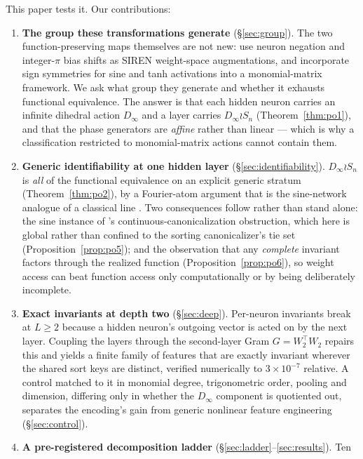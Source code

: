 \documentclass[10pt,twocolumn,letterpaper]{article}
\theoremstyle{definition}
\newcommand{\Dinf}{D_\infty}
\begin{document}
This paper tests it. Our contributions:

\begin{enumerate}\itemsep2pt
\item \textbf{The group these transformations generate} (\S\ref{sec:group}). The two
function-preserving maps themselves are not new: \citet{shamsian2024augmentations} use neuron
negation and integer-$\pi$ bias shifts as SIREN weight-space augmentations, and
\citet{tran2024monomial} incorporate sign symmetries for sine and tanh activations into a
monomial-matrix framework. We ask what group they generate and whether it exhausts functional
equivalence. The answer is that each hidden neuron carries an infinite dihedral action $\Dinf$ and
a layer carries $\Dinf \wr S_n$ (Theorem~\ref{thm:po1}), and that the phase generators are
\emph{affine} rather than linear --- which is why a classification restricted to monomial-matrix
actions cannot contain them.
\item \textbf{Generic identifiability at one hidden layer} (\S\ref{sec:identifiability}).
$\Dinf \wr S_n$ is \emph{all} of the functional equivalence on an explicit generic stratum
(Theorem~\ref{thm:po2}), by a Fourier-atom argument that is the sine-network analogue of a
classical line \citep{hechtnielsen1990algebraic,sussmann1992uniqueness,fefferman1994reconstructing}.
Two consequences follow rather than stand alone: the sine instance of
\citeauthor{dym2024impossibility}'s continuous-canonicalization obstruction, which here is global
rather than confined to the sorting canonicalizer's tie set (Proposition~\ref{prop:po5}); and the observation that any
\emph{complete} invariant factors through the realized function
(Proposition~\ref{prop:po6}), so weight access can beat function access only computationally or by
being deliberately incomplete.
\item \textbf{Exact invariants at depth two} (\S\ref{sec:deep}). Per-neuron invariants break at
$L\ge 2$ because a hidden neuron's outgoing vector is acted on by the next layer. Coupling the
layers through the second-layer Gram $G = W_2^\top W_2$ repairs this and yields a finite family of features that
are exactly invariant wherever the shared sort keys are distinct, verified numerically to
$3\times10^{-7}$ relative. A control
matched to it in monomial degree, trigonometric order, pooling and dimension, differing only in
whether the $\Dinf$ component is quotiented out, separates the encoding's gain from generic
nonlinear feature engineering (\S\ref{sec:control}).
\item \textbf{A pre-registered decomposition ladder} (\S\ref{sec:ladder}--\ref{sec:results}). Ten

\end{enumerate}
\end{document}
